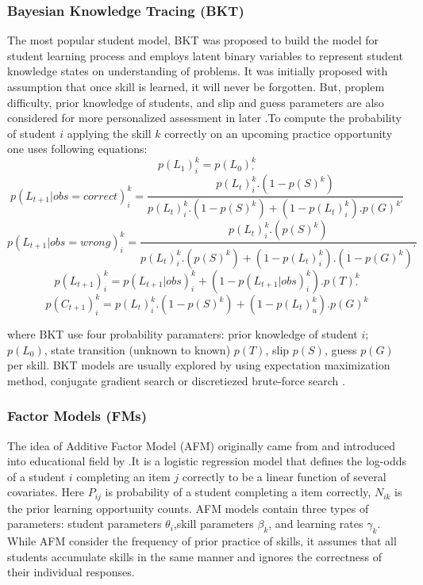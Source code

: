 \documentclass[12pt]{article}
\begin{document}
\subsubsection{Bayesian Knowledge Tracing (BKT) }
 The most popular student model, BKT was proposed \cite{corbett1994knowledge} to build the model for student learning process and employs latent binary variables to represent student knowledge states on understanding of problems. It was initially proposed with assumption that once skill is learned, it will never be forgotten. But, proplem difficulty, prior knowledge of students, and slip and guess parameters are also considered for more personalized assessment in later \cite{d2008more,pardos2011kt,yudelson2013individualized}.To compute the probability of student $i$ applying the skill $k$ correctly on an upcoming practice opportunity one uses following equations: 
 $$ p(L_1)_i^k = p(L_0)^k_{'}$$  
 $$ p(L_{t+1}|obs=correct)_i^k = \frac{p(L_t)_i^k . (1-p(S)^k)}{p(L_t)_i^k . (1-p(S)^k)+(1-p(L_t)_i^k). p(G)^{k'}}$$
$$ p(L_{t+1}|obs=wrong)_i^k = \frac{p(L_t)_i^k . (p(S)^k)}{p(L_t)_i^k . (p(S)^k)+(1-p(L_t)_i^k). (1-p(G)^{k})^{'}}$$
$$p(L_{t+1})_i^k = p(L_{t+1}|obs)_i^k +(1-p(L_{t+1}|obs)_i^k) .p(T)^k_{'}$$
$$p(C_{t+1})_i^k = p(L_t)_i^k . (1-p(S)^k)+(1-p(L_t)_u^k) . p(G)^k$$

where BKT use four probability paramaters: prior knowledge of student $i$; $p(L_0)$, state transition (unknown to known) $p(T)$, slip $p(S)$, guess $p(G)$ per skill. BKT models are usually explored by using expectation maximization method, conjugate gradient search or discretiezed brute-force search \cite{yudelson2013individualized}.  



\subsubsection{Factor Models (FMs) }
   The idea of Additive Factor Model (AFM) originally came from \cite{draney1995measurement} and introduced into educational field by \cite{cen2006learning,cen2008comparing}.It is a logistic regression model that defines the log-odds of a student $i$ completing an item $j$ correctly to be a linear function of several covariates. Here $P_{ij}$ is probability of a student completing a item correctly, $N_{ik}$ is the prior learning opportunity counts. AFM models contain three types of parameters: student parameters $\theta_i$,skill parameters $\beta_k$, and learning rates $\gamma_k$. While AFM consider the frequency of prior practice of skills, it assumes that all students accumulate skills in the same manner and ignores the correctness of their individual responses.
\end{document}

